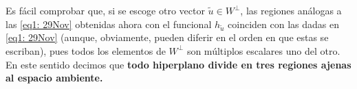 Es fácil comprobar que,
si se escoge otro vector $\tilde{u} \in W^{\perp}$,
las regiones análogas a las
\eqref{eq1: 29Nov} obtenidas ahora con el funcional
$h_{\tilde{u}}$ coinciden con las dadas en \eqref{eq1: 29Nov}
(aunque,
obviamente, pueden diferir en el orden en que estas se escriban),
pues todos los elementos de $W^{\perp}$ son múltiplos
escalares uno del otro.
En este sentido decimos que \textbf{todo hiperplano
divide en tres regiones ajenas al espacio ambiente.}



